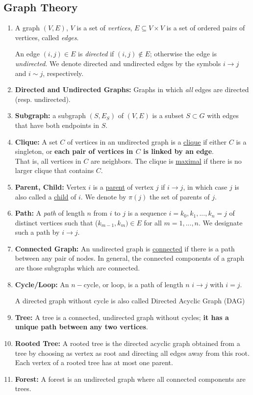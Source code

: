 \documentclass[11pt,a4paper]{article}
\begin{document}
\subsection{Graph Theory}
\begin{enumerate}
    \item A graph $(V,E)$, $V$ is a set of \textit{vertices}, $E\subseteq V\times V$ is a set of ordered pairs of vertices, called \textit{edges}.
    
    An edge $(i,j)\in E$ is \textit{directed} if $(i,j)\notin E$; otherwise the edge is \textit{undirected}. We denote directed and undirected edges by the symbols $i \rightarrow j$ and $i\sim j$, respectively.
    \item \textbf{Directed and Undirected Graphs:} Graphs in which \textit{all} edges are directed (resp. undirected).
    \item \textbf{Subgraph:} a subgraph $(S,E_S)$ of $(V,E)$ is a subset $S\subset G$ with edges that have both endpoints in $S$.
    \item \textbf{Clique:} A set $C$ of vertices in an undirected graph is a \underline{clique} if either $C$ is a singleton, or \textbf{each pair of vertices in $C$ is linked by an edge}.\\
    That is, all vertices in $C$ are neighbors. The clique is \underline{maximal} if there is no larger clique that contains $C$.
    \item \textbf{Parent, Child:} Vertex $i$ is a \underline{parent} of vertex $j$ if $i \rightarrow j$, in which case $j$ is also called a \underline{child} of $i$. We denote by $\pi(j)$ the set of parents of $j$.
    \item \textbf{Path:} A \textit{path} of length $n$ from $i$ to $j$ is a sequence $i = k_0,k_1,...,k_n = j$ of distinct vertices such that ($k_{m-1},k_m) \in E$ for all $m = 1,... ,n$. We designate such a path by $i \rightarrow j$.
    \item \textbf{Connected Graph:} An undirected graph is \underline{connected} if there is a path between any pair of nodes. In general, the connected components of a graph are those subgraphs which are connected.
    \item \textbf{Cycle/Loop:} An $n-$cycle, or loop, is a path of length $n$ $i \rightarrow j$ with $i = j$.
    
    A directed graph without cycle is also called Directed Acyclic Graph (DAG)
    \item \textbf{Tree:} A tree is a connected, undirected graph without cycles; \textbf{it has a unique path between any two vertices}.
    \item \textbf{Rooted Tree:} A rooted tree is the directed acyclic graph obtained from a tree by choosing as vertex as root and directing all edges away from this root. Each vertex of a rooted tree has at most one parent.
    \item \textbf{Forest:} A forest is an undirected graph where all connected components are trees.
\end{enumerate}
\end{document}
